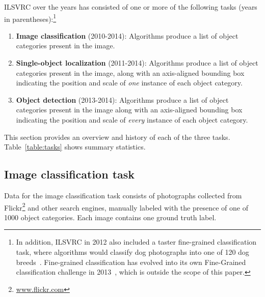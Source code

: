 


ILSVRC  over the years has consisted of one or more of the following tasks (years in parentheses):\footnote{In addition, ILSVRC in 2012 also included a taster fine-grained classification task, where algorithms would classify dog photographs into one of 120 dog breeds~\citep{Khosla11}. Fine-grained classification has evolved into its own Fine-Grained classification challenge in 2013~\citep{FGcomp}, which is outside the scope of this paper.}
\begin{enumerate}
\item {\bf Image classification} (2010-2014): Algorithms produce a list of object categories present in the image. 
\item {\bf Single-object localization} (2011-2014): Algorithms produce a list of object categories present in the image, along with an axis-aligned bounding box indicating the position and scale of \emph{one} instance of each object category. 
\item {\bf Object detection} (2013-2014): Algorithms produce a list of object categories present in the image along with an axis-aligned bounding box indicating the position and scale of \emph{every} instance of each object category.
\end{enumerate}
This section provides an overview and history of each of the three tasks. Table~\ref{table:tasks} shows summary statistics.






\subsection{Image classification task}
\label{sec:TasksCls}

Data for the image classification task consists of photographs collected from Flickr\footnote{\url{www.flickr.com}} and other search engines, manually labeled with the presence of one of 1000 object categories. Each image contains one ground truth label. 

